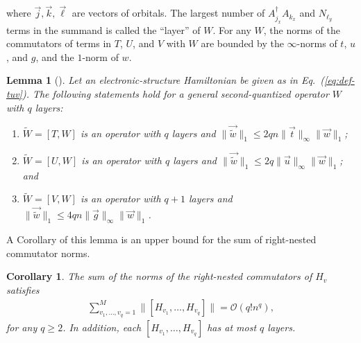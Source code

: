 \documentclass[aps,pra,reprint,groupedaddress,floatfix]{revtex4-2}
\newtheorem{lemma}{Lemma}
\newtheorem{corollary}{Corollary}
\newcommand{\eq}[1]{(\ref{eq:#1})}
\begin{document}
where $\vec{j}, \vec{k},\vec{\ell}$ are vectors of orbitals. The largest number of $A_{j_x}^{\dagger} A_{k_x}$ and $N_{\ell_y}$ terms in the summand is called the ``layer'' of $W$. For any $W$, the norms of the commutators of terms in $T$, $U$, and $V$ with $W$ are bounded by the $\infty$-norms of $t$, $u$, and $g$, and the $1$-norm of $w$.
\begin{lemma}[{\cite[Proposition F.4]{childs2021theory}}]
\label{lem:recursion-W}
     Let an electronic-structure Hamiltonian be given as in Eq.~\eq{def-tuv}. The following statements hold for a general second-quantized operator $W$ with $q$ layers:
     \begin{enumerate}
         \item $\tilde{W}=[T, W]$ is an operator with $q$ layers and $\|\vec{\tilde{w}}\|_1 \leq 2 q n\|\vec{t}\|_{\infty}\|\vec{w}\|_1 $;
         \item $\tilde{W}=[U, W]$ is an operator with $q$ layers and $\|\vec{\tilde{w}}\|_1 \leq 2 q\|\vec{u}\|_{\infty}\|\vec{w}\|_1$; and 
         \item $\tilde{W}=[V, W]$ is an operator with $q+1$ layers and $\|\vec{\tilde{w}}\|_1 \leq 4 q n\|\vec{g}\|_{\infty}\|\vec{w}\|_1$.
     \end{enumerate}
\end{lemma}
A Corollary of this lemma is an upper bound for the sum of right-nested commutator norms. 
\begin{corollary}
\label{cor:right-comm-second}
    The sum of the norms of the right-nested commutators of $H_v$ satisfies 
    \begin{align*}
        \sum_{v_1, \ldots, v_q=1}^{M} \|[H_{v_1}, \ldots, H_{v_q}]\| = \mathcal{O}(q! n^q),
    \end{align*}
    for any $q\ge 2$. In addition, each $[H_{v_1}, \ldots, H_{v_q}]$ has at most $q$ layers. 
\end{corollary}
\end{document}
